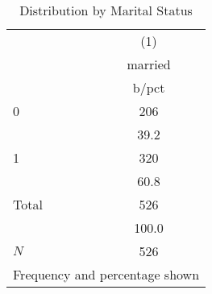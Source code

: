 \begin{table}[htbp]\centering
\def\sym#1{\ifmmode^{#1}\else\(^{#1}\)\fi}
\caption{Distribution by Marital Status}\label{tab:0201-married_frequency}
\begin{tabular}{l*{1}{c}}
\toprule
            &\multicolumn{1}{c}{(1)}\\
            &\multicolumn{1}{c}{married}\\
            &       b/pct\\
\midrule
0           &         206\\
            &        39.2\\
1           &         320\\
            &        60.8\\
Total       &         526\\
            &       100.0\\
\midrule
\(N\)       &         526\\
\bottomrule
\multicolumn{2}{l}{\footnotesize Frequency and percentage shown}\\
\end{tabular}
\end{table}
